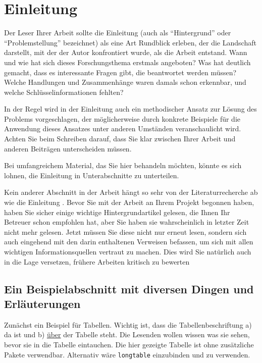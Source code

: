 
\chapter{Einleitung}

Der Leser Ihrer Arbeit sollte die Einleitung (auch als \enquote{Hintergrund} oder \enquote{Problemstellung} bezeichnet) als eine Art Rundblick erleben, 
der die Landschaft darstellt, mit der der Autor konfrontiert wurde, als die Arbeit entstand. Wann und wie hat sich dieses Forschungsthema erstmals angeboten? 
Was hat deutlich gemacht, dass es interessante Fragen gibt, die beantwortet werden müssen? Welche Handlungen und Zusammenhänge waren damals schon erkennbar, und welche Schlüsselinformationen fehlten? 

In der Regel wird in der Einleitung auch ein methodischer Ansatz zur Lösung des Problems vorgeschlagen, 
der möglicherweise durch konkrete Beispiele für die Anwendung dieses Ansatzes unter anderen Umständen veranschaulicht wird. 
Achten Sie beim Schreiben darauf, dass Sie klar zwischen Ihrer Arbeit und anderen Beiträgen unterscheiden müssen.

Bei umfangreichem Material, das Sie hier behandeln möchten, könnte es sich lohnen, die Einleitung in Unterabschnitte zu unterteilen.

Kein anderer Abschnitt in der Arbeit hängt so sehr von der Literaturrecherche ab wie die Einleitung \cite{aoscw2004}. 
Bevor Sie mit der Arbeit an Ihrem Projekt begonnen haben, haben Sie sicher einige wichtige Hintergrundartikel gelesen, 
die Ihnen Ihr Betreuer schon empfohlen hat, aber Sie haben sie wahrscheinlich in letzter Zeit nicht mehr gelesen. 
Jetzt müssen Sie diese nicht nur erneut lesen, sondern sich auch eingehend mit den darin enthaltenen Verweisen befassen, 
um sich mit allen wichtigen Informationsquellen vertraut zu machen. Dies wird Sie natürlich auch in die Lage versetzen, 
frühere Arbeiten kritisch zu bewerten

\newpage

\section{Ein Beispielabschnitt mit diversen Dingen und Erläuterungen}
Zunächst ein Beispiel für Tabellen. Wichtig ist, dass die Tabellenbeschriftung a) da ist und b) \underline{über} der Tabelle steht. Die Lesenden wollen wissen was sie sehen, bevor sie in die Tabelle eintauchen.
Die hier gezeigte Tabelle ist ohne zusätzliche Pakete verwendbar. Alternativ wäre \texttt{longtable} einzubinden und zu verwenden.

